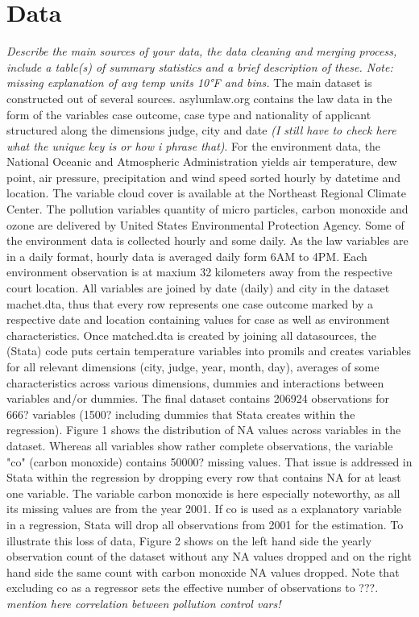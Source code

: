 \documentclass[11pt]{article}
\begin{document}
	\section{Data}
	\textit{Describe the main sources of your data, the data cleaning and merging process, include a table(s) of summary statistics and a brief description of these. Note: missing explanation of avg temp units 10°F and bins.}
	\newline
	The main dataset is constructed out of several sources. asylumlaw.org contains the law data in the form of the variables case outcome, case type and nationality of applicant structured along the dimensions judge, city and date \textit{(I still have to check here what the unique key is or how i phrase that)}. For the environment data, the National Oceanic and Atmospheric Administration yields air temperature, dew point, air pressure, precipitation and wind speed sorted hourly by datetime and location. The variable cloud cover is available at the Northeast Regional Climate Center. The pollution variables quantity of micro particles, carbon monoxide and ozone are delivered by United States Environmental Protection Agency. Some of the environment data is collected hourly and some daily. As the law variables are in a daily format, hourly data is averaged daily form 6AM to 4PM. Each environment observation is at maxium 32 kilometers away from the respective court location.
	All variables are joined by date (daily) and city in the dataset machet.dta, thus that every row represents one case outcome marked by a respective date and location containing values for case as well as environment characteristics. \newline
	Once matched.dta is created by joining all datasources, the (Stata) code puts certain temperature variables into promils and creates variables for all relevant dimensions (city, judge, year, month, day), averages of some characteristics across various dimensions, dummies and interactions between variables and/or dummies. The final dataset contains 206924 observations for 666? variables (1500? including dummies that Stata creates within the regression).
	Figure 1 shows the distribution of NA values across variables in the dataset. Whereas all variables show rather complete observations, the variable "co" (carbon monoxide) contains 50000? missing values.
	That issue is addressed in Stata within the regression by dropping every row that contains NA for at least one variable. The variable carbon monoxide is here especially noteworthy, as all its missing values are from the year 2001. If co is used as a explanatory variable in a regression, Stata will drop all observations from 2001 for the estimation. To illustrate this loss of data, Figure 2 shows on the left hand side the yearly observation count of the dataset without any NA values dropped and on the right hand side the same count with carbon monoxide NA values dropped. Note that excluding co as a regressor sets the effective number of observations to ???. \textit{mention here correlation between pollution control vars!}
\end{document}
